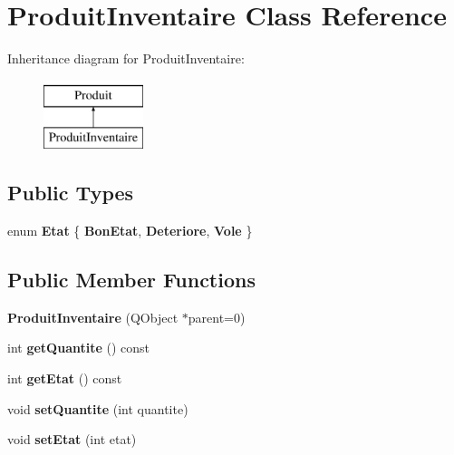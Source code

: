 \hypertarget{class_produit_inventaire}{
\section{ProduitInventaire Class Reference}
\label{class_produit_inventaire}
}
Inheritance diagram for ProduitInventaire:\begin{figure}[H]
\begin{center}
\leavevmode
\includegraphics[height=2.000000cm]{class_produit_inventaire}
\end{center}
\end{figure}
\subsection*{Public Types}
\begin{DoxyCompactItemize}
\item 
enum {\bfseries Etat} \{ {\bfseries BonEtat}, 
{\bfseries Deteriore}, 
{\bfseries Vole}
 \}
\end{DoxyCompactItemize}
\subsection*{Public Member Functions}
\begin{DoxyCompactItemize}
\item 
\hypertarget{class_produit_inventaire_a11acef1e64475b073f9e6470a741fb36}{
{\bfseries ProduitInventaire} (QObject $\ast$parent=0)}
\label{class_produit_inventaire_a11acef1e64475b073f9e6470a741fb36}

\item 
\hypertarget{class_produit_inventaire_a0ccf9d4d6809dadd801381af484b408c}{
int {\bfseries getQuantite} () const }
\label{class_produit_inventaire_a0ccf9d4d6809dadd801381af484b408c}

\item 
\hypertarget{class_produit_inventaire_a3882ff83f08c706cdc84003b3c0ae6e6}{
int {\bfseries getEtat} () const }
\label{class_produit_inventaire_a3882ff83f08c706cdc84003b3c0ae6e6}

\item 
\hypertarget{class_produit_inventaire_a99c8884b501c238e2fee2c72edffa0f3}{
void {\bfseries setQuantite} (int quantite)}
\label{class_produit_inventaire_a99c8884b501c238e2fee2c72edffa0f3}

\item 
\hypertarget{class_produit_inventaire_a9bdff5921126b87e78ca8dfe9701d28f}{
void {\bfseries setEtat} (int etat)}
\label{class_produit_inventaire_a9bdff5921126b87e78ca8dfe9701d28f}

\end{DoxyCompactItemize}
